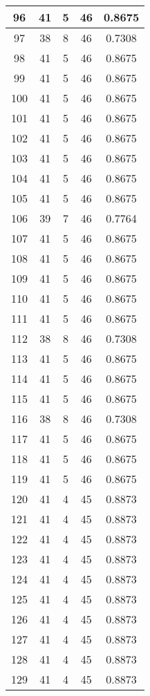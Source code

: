 \documentclass[letterpaper, 12pt]{article}
\begin{document}
\begin{longtable}{|c|c|c|c|c|}
\hline
96 & 41 & 5 & 46 & 0.8675 \\
\hline
97 & 38 & 8 & 46 & 0.7308 \\
\hline
98 & 41 & 5 & 46 & 0.8675 \\
\hline
99 & 41 & 5 & 46 & 0.8675 \\
\hline
100 & 41 & 5 & 46 & 0.8675 \\
\hline
101 & 41 & 5 & 46 & 0.8675 \\
\hline
102 & 41 & 5 & 46 & 0.8675 \\
\hline
103 & 41 & 5 & 46 & 0.8675 \\
\hline
104 & 41 & 5 & 46 & 0.8675 \\
\hline
105 & 41 & 5 & 46 & 0.8675 \\
\hline
106 & 39 & 7 & 46 & 0.7764 \\
\hline
107 & 41 & 5 & 46 & 0.8675 \\
\hline
108 & 41 & 5 & 46 & 0.8675 \\
\hline
109 & 41 & 5 & 46 & 0.8675 \\
\hline
110 & 41 & 5 & 46 & 0.8675 \\
\hline
111 & 41 & 5 & 46 & 0.8675 \\
\hline
112 & 38 & 8 & 46 & 0.7308 \\
\hline
113 & 41 & 5 & 46 & 0.8675 \\
\hline
114 & 41 & 5 & 46 & 0.8675 \\
\hline
115 & 41 & 5 & 46 & 0.8675 \\
\hline
116 & 38 & 8 & 46 & 0.7308 \\
\hline
117 & 41 & 5 & 46 & 0.8675 \\
\hline
118 & 41 & 5 & 46 & 0.8675 \\
\hline
119 & 41 & 5 & 46 & 0.8675 \\
\hline
120 & 41 & 4 & 45 & 0.8873 \\
\hline
121 & 41 & 4 & 45 & 0.8873 \\
\hline
122 & 41 & 4 & 45 & 0.8873 \\
\hline
123 & 41 & 4 & 45 & 0.8873 \\
\hline
124 & 41 & 4 & 45 & 0.8873 \\
\hline
125 & 41 & 4 & 45 & 0.8873 \\
\hline
126 & 41 & 4 & 45 & 0.8873 \\
\hline
127 & 41 & 4 & 45 & 0.8873 \\
\hline
128 & 41 & 4 & 45 & 0.8873 \\
\hline
129 & 41 & 4 & 45 & 0.8873 \\

\end{longtable}
\end{document}
